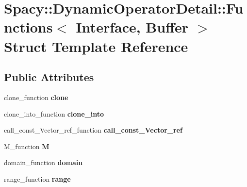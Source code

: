 \hypertarget{structSpacy_1_1DynamicOperatorDetail_1_1Functions}{\section{\-Spacy\-:\-:\-Dynamic\-Operator\-Detail\-:\-:\-Functions$<$ \-Interface, \-Buffer $>$ \-Struct \-Template \-Reference}
\label{structSpacy_1_1DynamicOperatorDetail_1_1Functions}
}
\subsection*{\-Public \-Attributes}
\begin{DoxyCompactItemize}
\item 
\hypertarget{structSpacy_1_1DynamicOperatorDetail_1_1Functions_aebbb31240fb82aeba4e6f6fe1d3548c9}{clone\-\_\-function {\bfseries clone}}\label{structSpacy_1_1DynamicOperatorDetail_1_1Functions_aebbb31240fb82aeba4e6f6fe1d3548c9}

\item 
\hypertarget{structSpacy_1_1DynamicOperatorDetail_1_1Functions_a6f931d5ea15fc9897c8defd8734d16cd}{clone\-\_\-into\-\_\-function {\bfseries clone\-\_\-into}}\label{structSpacy_1_1DynamicOperatorDetail_1_1Functions_a6f931d5ea15fc9897c8defd8734d16cd}

\item 
\hypertarget{structSpacy_1_1DynamicOperatorDetail_1_1Functions_ad1530d2398cdfabcaf01552f459547a6}{call\-\_\-const\-\_\-\-Vector\-\_\-ref\-\_\-function {\bfseries call\-\_\-const\-\_\-\-Vector\-\_\-ref}}\label{structSpacy_1_1DynamicOperatorDetail_1_1Functions_ad1530d2398cdfabcaf01552f459547a6}

\item 
\hypertarget{structSpacy_1_1DynamicOperatorDetail_1_1Functions_a83cf5583d93402c17356135069b3cba9}{\-M\-\_\-function {\bfseries \-M}}\label{structSpacy_1_1DynamicOperatorDetail_1_1Functions_a83cf5583d93402c17356135069b3cba9}

\item 
\hypertarget{structSpacy_1_1DynamicOperatorDetail_1_1Functions_a626e3600a0ee37c0cb4f6e2424257ab3}{domain\-\_\-function {\bfseries domain}}\label{structSpacy_1_1DynamicOperatorDetail_1_1Functions_a626e3600a0ee37c0cb4f6e2424257ab3}

\item 
\hypertarget{structSpacy_1_1DynamicOperatorDetail_1_1Functions_aaa6056382120817816f645de5f716583}{range\-\_\-function {\bfseries range}}\label{structSpacy_1_1DynamicOperatorDetail_1_1Functions_aaa6056382120817816f645de5f716583}

\end{DoxyCompactItemize}
